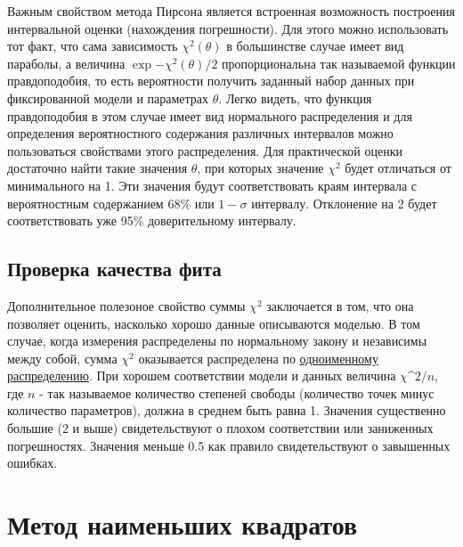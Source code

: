 Важным свойством метода Пирсона является встроенная возможность построения интервальной оценки (нахождения погрешности). Для этого можно использовать тот факт, что сама зависимость $\chi^2(\theta)$ в большинстве случае имеет вид параболы, а величина $\exp{- \chi^2(\theta)/2}$ пропорциональна так называемой функции правдоподобия, то есть вероятности получить заданный набор данных при фиксированной модели и параметрах $\theta$. Легко видеть, что функция правдоподобия в этом случае имеет вид нормального распределения и для определения вероятностного содержания различных интервалов можно пользоваться свойствами этого распределения. Для практической оценки достаточно найти такие значения $\theta$, при которых значение $\chi^2$ будет отличаться от минимального на 1. Эти значения будут соответствовать краям интервала с вероятностным содержанием 68\% или $1-\sigma$ интервалу. Отклонение на 2 будет соответствовать уже 95\% доверительному интервалу.


\subsection{Проверка качества фита}

Дополнительное полезоное свойство суммы $\chi^2$ заключается в том,
что она позволяет оценить, насколько хорошо данные описываются моделью.
В том случае, когда измерения распределены по нормальному закону и
независимы между собой, сумма $\chi^2$ оказывается распределена по
\href{https://ru.wikipedia.org/wiki/\%D0\%A0\%D0\%B0\%D1\%81\%D0\%BF\%D1\%80\%D0\%B5\%D0\%B4\%D0\%B5\%D0\%BB\%D0\%B5\%D0\%BD\%D0\%B8\%D0\%B5_\%D1\%85\%D0\%B8-\%D0\%BA\%D0\%B2\%D0\%B0\%D0\%B4\%D1\%80\%D0\%B0\%D1\%82}{одноименному
распределению}. При хорошем соответствии модели и данных величина
$\chi\^{}2 / n $, где $n$ - так называемое количество степеней
свободы (количество точек минус количество параметров), должна в среднем
быть равна 1. Значения существенно большие (2 и выше) свидетельствуют о
плохом соответствии или заниженных погрешностях. Значения меньше 0.5 как
правило свидетельствуют о завышенных ошибках.

\section{Метод наименьших квадратов}

